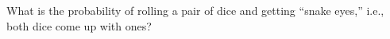 What is the probability of rolling a pair of dice and
getting ``snake eyes,'' i.e., both dice come up with ones?
